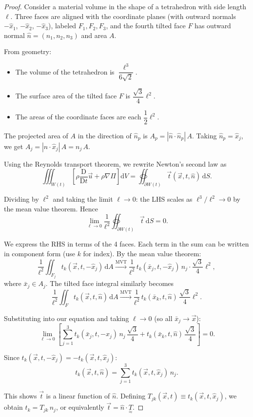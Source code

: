 \documentclass[11pt,a4paper]{article}
\newcommand{\D}{\mathrm{D}}
\newcommand{\Dt}{\frac{\D}{\D t}}
\newcommand{\xv}{\vec{x}}
\newcommand{\uv}{\vec{u}}
\newcommand{\nhat}{\hat{n}}
\newcommand{\tv}{\vec{t}}
\newcommand{\tens}[1]{\underset{\approx}{#1}}
\begin{document}
\begin{proof}
Consider a material volume in the shape of a tetrahedron with side length $\ell$. Three faces are aligned with the coordinate planes (with outward normals $-\hat{x}_1$, $-\hat{x}_2$, $-\hat{x}_3$), labeled $F_1, F_2, F_3$, and the fourth tilted face $F$ has outward normal $\nhat = (n_1, n_2, n_3)$ and area $A$.

From geometry:
\begin{itemize}[nosep]
    \item The volume of the tetrahedron is $\dfrac{\ell^3}{6\sqrt{2}}$.
    \item The surface area of the tilted face $F$ is $\dfrac{\sqrt{3}}{4}\ell^2$.
    \item The areas of the coordinate faces are each $\dfrac{1}{2}\ell^2$.
\end{itemize}

The projected area of $A$ in the direction of $\hat{n}_p$ is $A_p = |\nhat \cdot \hat{n}_p|\,A$. Taking $\hat{n}_p = \hat{x}_j$, we get $A_j = |\nhat \cdot \hat{x}_j|\,A = n_j\,A$.

Using the Reynolds transport theorem, we rewrite Newton's second law as
\[
    \iiint_{W(t)} \left[\rho \Dt\uv + \rho\nabla\Pi\right] \mathrm{d}V
    = \oiint_{\partial W(t)} \tv(\xv, t, \nhat) \, \mathrm{d}S.
\]

Dividing by $\ell^2$ and taking the limit $\ell \to 0$: the LHS scales as $\ell^3/\ell^2 \to 0$ by the mean value theorem. Hence
\[
    \lim_{\ell \to 0} \frac{1}{\ell^2} \oiint_{\partial W(t)} \tv \, \mathrm{d}S = 0.
\]

We express the RHS in terms of the 4 faces. Each term in the sum can be written in component form (use $k$ for index). By the mean value theorem:
\[
    \frac{1}{\ell^2}\iint_{F_j} t_k(\xv, t, -\hat{x}_j)\,\mathrm{d}A
    \xrightarrow{\text{MVT}} \frac{1}{\ell^2}\, t_k(\bar{x}_j, t, -\hat{x}_j)\, n_j \cdot \frac{\sqrt{3}}{4}\ell^2,
\]
where $\bar{x}_j \in A_j$. The tilted face integral similarly becomes
\[
    \frac{1}{\ell^2}\iint_F t_k(\xv, t, \nhat)\,\mathrm{d}A
    \xrightarrow{\text{MVT}} \frac{1}{\ell^2}\, t_k(\bar{x}_k, t, \nhat)\, \frac{\sqrt{3}}{4}\ell^2.
\]

Substituting into our equation and taking $\ell \to 0$ (so all $\bar{x}_j \to \xv$):
\[
    \lim_{\ell \to 0}\left[\sum_{j=1}^{3} t_k(\bar{x}_j, t, -\hat{x}_j)\,n_j\,\frac{\sqrt{3}}{4} + t_k(\bar{x}_k, t, \nhat)\,\frac{\sqrt{3}}{4}\right] = 0.
\]

Since $t_k(\xv, t, -\hat{x}_j) = -t_k(\xv, t, \hat{x}_j)$:
\[
    \boxed{t_k(\xv, t, \nhat) = \sum_{j=1}^{3} t_k(\xv, t, \hat{x}_j)\, n_j.}
\]

This shows $\tv$ is a linear function of $\nhat$. Defining $T_{jk}(\xv,t) \equiv t_k(\xv, t, \hat{x}_j)$, we obtain $t_k = T_{jk}\, n_j$, or equivalently $\tv = \nhat \cdot \tens{T}$.
\end{proof}
\end{document}
